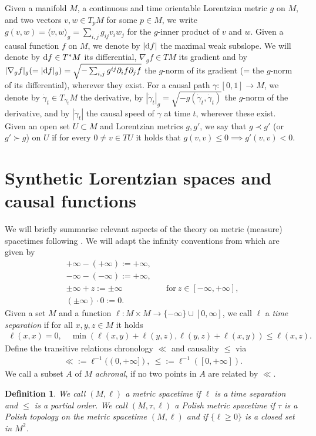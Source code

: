 \documentclass[a4paper,10pt]{article}
\newtheorem{definition}[theorem]{Definition}
\numberwithin{equation}{section}
\newcommand{\di}{{\rm d}}
\begin{document}
Given a manifold $M$, a continuous and time orientable Lorentzian metric $g$ on $M$, and two vectors $v, w \in T_pM$ for some $p \in M$, we write $g(v,w) = \langle v, w \rangle_g = \sum_{i,j} g_{ij}v_iw_j$ for the $g$-inner product of $v$ and $w$.
Given a causal function $f$ on $M$, we denote by $|\di f|$ the maximal weak subslope.
We will denote by $\di f \in T^*M$ its differential, $\nabla_g f \in TM$ its gradient and by $|\nabla_g f|_g(=|\di f|_g) = \sqrt{-\sum_{i,j}g^{ij}\partial_if\partial_jf}$ the $g$-norm of its gradient (= the $g$-norm of its differential), wherever they exist. For a causal path $\gamma\colon [0,1] \to M$, we denote by $\dot{\gamma}_t \in T_{\gamma_t}M$ the derivative, by $|\dot{\gamma}_t|_g = \sqrt{-g(\dot{\gamma}_t, \dot{\gamma}_t)}$ the $g$-norm of the derivative, and by $|\dot{\gamma}_t|$ the causal speed of $\gamma$ at time $t$, wherever these exist. \\
Given an open set $U \subset M$ and Lorentzian metrics $g, g'$, we say that $g \prec g'$ (or $g' \succ g$) on $U$ if for every $0 \neq v \in TU$ it holds that $g(v,v) \leq 0 \implies g'(v,v) < 0$.
\section{Synthetic Lorentzian spaces and causal functions}\label{sec2}
We will briefly summarise relevant aspects of the theory on metric (measure) spacetimes following \cite{beran2024nonlinear}. We will adapt the infinity conventions from \cite{beran2024nonlinear} which are given by
\begin{align*}
    +\infty -(+\infty) := +\infty,&\\
    -\infty -(-\infty) := +\infty,&\\
    \pm \infty +z := \pm \infty& \quad \mathrm{for}\ z \in [-\infty, +\infty],\\
    (\pm \infty) \cdot 0 := 0.
\end{align*}
Given a set $M$ and a function $\ell\colon  M \times M \to \{-\infty\} \cup [0, \infty]$, we call $\ell$ a \emph{time separation} if for all $x, y, z \in M$ it holds
\begin{align*}
   \ell(x,x) =0, \quad \min(\ell(x,y)+\ell(y,z), \ell(y,z)+ \ell(x,y)) \leq \ell(x,z).
\end{align*}
Define the transitive relations chronology $\ll$ and causality $\leq$ via
\begin{align*}
    \ll := \ell^{-1}((0, +\infty]), \ \leq := \ell^{-1}([0, +\infty]).
\end{align*}
We call a subset $A$ of $M$ \emph{achronal}, if no two points in $A$ are related by $\ll$. 
\begin{definition}
    We call $(M, \ell)$ a \emph{metric spacetime} if $\ell$ is a time separation and $\leq$ is a partial order. We call $(M, \tau, \ell)$ a \emph{Polish metric spacetime} if $\tau$ is a Polish topology on the metric spacetime $(M, \ell)$ and if $\{\ell \ge 0\}$ is a closed set in $M^2$. 
\end{definition}
\smallskip
\end{document}
